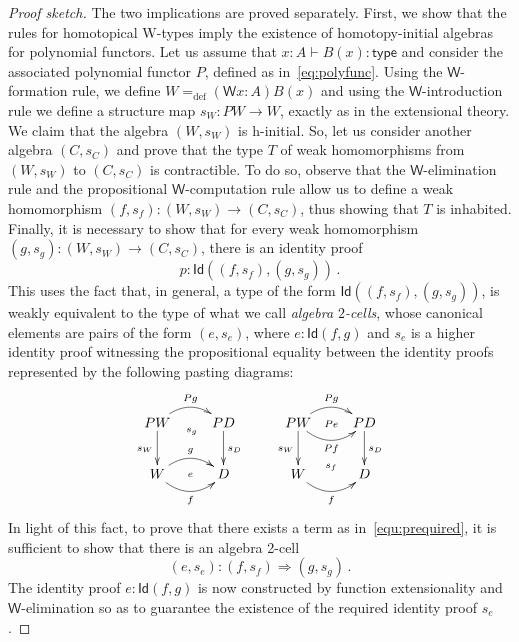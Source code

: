 \documentclass{article}
\newcommand{\defeq}{=_{\mathrm{def}}}
\newcommand{\type}{\mathsf{type}}
\newcommand{\Id}{\mathsf{Id}}
\newcommand{\W}{\mathsf{W}}
\theoremstyle{remark}
\theoremstyle{definition}
\begin{document}
\begin{proof}[Proof sketch] 
The two implications are proved separately.
First, we show that the rules for homotopical W-types imply the existence
of homotopy-initial algebras for polynomial functors. Let us assume that
$x : A \vdash B(x) : \type$ 
and consider the associated polynomial functor $P$, defined as in~\eqref{eq:polyfunc}.
Using the $\W$-formation rule, we define $W \defeq (\W x : A) B(x)$ and using
the $\W$-introduction rule we define a structure map $s_W : PW \rightarrow W$,
exactly as in the extensional theory. We claim that the algebra $(W, s_W)$ is
h-initial. So, let us consider another algebra $(C,s_C)$ and prove that the type $T$ 
of weak homomorphisms from $(W, s_W)$ to $(C,s_C)$ is contractible. To do
so, observe that the $\W$-elimination rule and the propositional $\W$-computation
rule allow us to define a weak homomorphism $(f, s_f) : (W, s_W) \rightarrow (C, s_C)$, 
thus showing that $T$ is inhabited. Finally, it is necessary to show that for every weak homomorphism $(g, s_g) : (W, s_W) \rightarrow (C, s_C)$, there
is an identity proof 
\begin{equation}
\label{equ:prequired}
p : \Id( (f,s_f), (g,s_g) ) \, .
\end{equation}
This uses the fact that, in general, a type of the form $\Id( (f,s_f), (g,s_g) )$,
is weakly equivalent to the type of what we call \emph{algebra $2$-cells}, whose canonical
elements are pairs of the form $(e, s_e)$, where $e : \Id(f,g)$ and $s_e$ is a higher identity proof witnessing the propositional equality between the identity proofs represented by the following pasting diagrams:
\[
\xymatrix{
PW \ar@/^1pc/[r]^{Pg}   \ar[d]_{s_W} \ar@{}[r]_(.52){s_g}  & PD \ar[d]^{s_D}  \\
W \ar@/^1pc/[r]^g  \ar@/_1pc/[r]_f  \ar@{}[r]|{e} & D } \qquad
\xymatrix{
PW \ar@/^1pc/[r]^{Pg}   \ar[d]_{s_W}   \ar@/_1pc/[r]_{Pf} \ar@{}[r]|{Pe}
& PD \ar[d]^{s_D}  \\
W  \ar@/_1pc/[r]_f  \ar@{}[r]^{s_f} & D }
\]
In light of this fact, to prove that there exists a term as in~\eqref{equ:prequired}, it is 
sufficient to show that there is an algebra 2-cell 
\[
(e,s_e) : (f,s_f) \Rightarrow (g,s_g) \, .
\]
The identity proof $e : \Id(f,g)$ is now constructed by function extensionality and
$\W$-elimination so as to guarantee the existence of the required identity
proof $s_e$. 

\smallskip


\end{proof}
\end{document}
